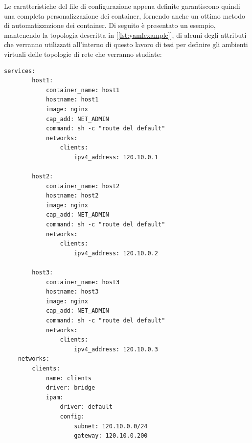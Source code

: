 Le caratteristiche del file di configurazione appena definite garantiscono quindi una completa personalizzazione dei container, fornendo anche un ottimo metodo di automatizzazione dei container.
Di seguito è presentato un esempio, mantenendo la topologia descritta in [\ref{lst:yamlexample}], di alcuni degli attributi che verranno utilizzati all'interno di questo lavoro di tesi per definire gli ambienti virtuali delle topologie di rete che verranno studiate: 

\begin{lstlisting}[style=yaml,caption={Esempio file di configurazione docker-compose},label=yamldocker]
    services: 
        host1:
            container_name: host1
            hostname: host1
            image: nginx
            cap_add: NET_ADMIN
            command: sh -c "route del default"
            networks:
                clients:
                    ipv4_address: 120.10.0.1

        host2:
            container_name: host2
            hostname: host2
            image: nginx
            cap_add: NET_ADMIN
            command: sh -c "route del default"
            networks:
                clients:
                    ipv4_address: 120.10.0.2
               
        host3:
            container_name: host3
            hostname: host3
            image: nginx
            cap_add: NET_ADMIN
            command: sh -c "route del default"
            networks:
                clients:
                    ipv4_address: 120.10.0.3
    networks:
        clients:
            name: clients
            driver: bridge
            ipam:
                driver: default
                config:
                    subnet: 120.10.0.0/24
                    gateway: 120.10.0.200
\end{lstlisting}